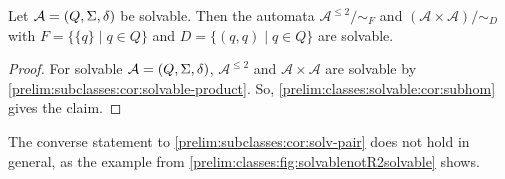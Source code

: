 \begin{corollary} \label{prelim:subclasses:cor:solv-pair}
	Let $\mathcal A = (Q, \Sigma, \delta)$ be solvable.
	Then the automata $\mathcal A^{\le 2} / {\sim_F}$
	and 
	$( \mathcal A \times \mathcal A ) / {\sim_D}$
	with $F = \{ \{q\} \mid q \in Q \}$
	and $D = \{ (q,q) \mid q \in Q \}$
	are solvable.	
\end{corollary}
\begin{proof}
	For solvable $\mathcal A = (Q, \Sigma, \delta)$,
	$\mathcal A^{\le 2}$ and $\mathcal A \times \mathcal A$ are solvable by \cref{prelim:subclasses:cor:solvable-product}.
	So, \cref{prelim:classes:solvable:cor:subhom}
    gives the claim.
\end{proof}

The converse statement to \cref{prelim:subclasses:cor:solv-pair}
does not hold in general, as the example from \cref{prelim:classes:fig:solvablenotR2solvable}
shows.

